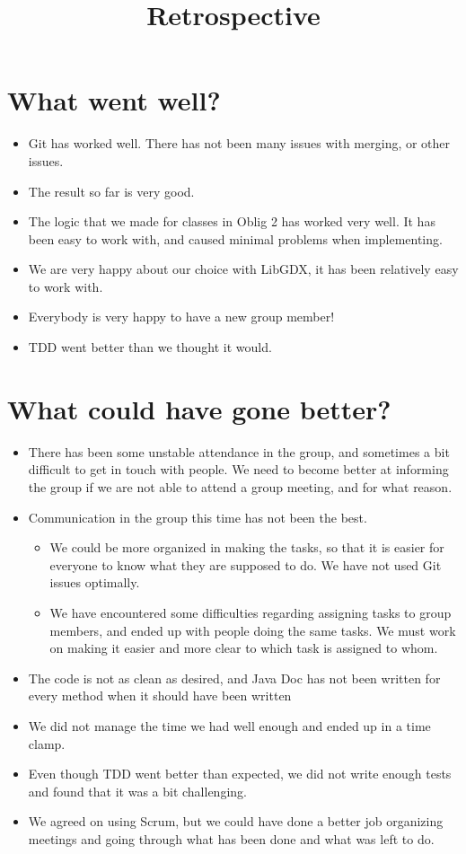 \documentclass{article}
\title{Retrospective}
\begin{document}
\date{}
\maketitle
{}
\section*{What went well?}
\begin{itemize}
\item Git has worked well. There has not been many issues with merging, or other issues.
\item The result so far is very good.
\item The logic that we made for classes in Oblig 2 has worked very well. It has been easy to work with, and caused minimal problems when implementing.
\item We are very happy about our choice with LibGDX, it has been relatively easy to work with.
\item Everybody is very happy to have a new group member!
\item TDD went better than we thought it would.
\end{itemize}

\section*{What could have gone better?}
\begin{itemize}
\item There has been some unstable attendance in the group, and sometimes a bit difficult to get in touch with people. We need to become better at informing the group if we are not able to attend a group meeting, and for what reason.
\item Communication in the group this time has not been the best.
\begin{itemize}
\item We could be more organized in making the tasks, so that it is easier for everyone to know what they are supposed to do. We have not used Git issues optimally.
\item We have encountered some difficulties regarding assigning tasks to group members, and ended up with people doing the same tasks. We must work on making it easier and more clear to which task is assigned to whom.
\end{itemize}
\item The code is not as clean as desired, and Java Doc has not been written for every method when it should have been written
\item We did not manage the time we had well enough and ended up in a time clamp.
\item Even though TDD went better than expected, we did not write enough tests and found that it was a bit challenging.
\item We agreed on using Scrum, but we could have done a better job organizing meetings and going through what has been done and what was left to do.
\end{itemize}
\end{document}

